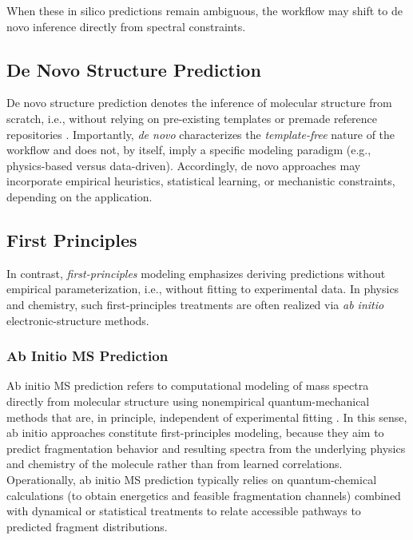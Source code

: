 When these in silico predictions remain ambiguous, the workflow may shift to de novo inference directly from spectral constraints.

\subsection{De Novo Structure Prediction}

De novo structure prediction denotes the inference of molecular structure from scratch, i.e., without relying on pre-existing templates or premade reference repositories
\cite[p.~1]{Yasonik2020}.
Importantly, \emph{de novo} characterizes the \emph{template-free} nature of the workflow and does not, by itself, imply a specific modeling paradigm (e.g., physics-based versus data-driven).
Accordingly, de novo approaches may incorporate empirical heuristics, statistical learning, or mechanistic constraints, depending on the application. \cite[pp.~701--702]{Wei2019}

\subsection{First Principles}
In contrast, \emph{first-principles} modeling emphasizes deriving predictions without empirical parameterization, i.e., without fitting to experimental data. \cite[p.~1]{Bhattacharyya2019}
In physics and chemistry, such first-principles treatments are often realized via \emph{ab initio} electronic-structure methods.

\subsubsection{Ab Initio MS Prediction}

Ab initio MS prediction refers to computational modeling of mass spectra directly from molecular structure using nonempirical quantum-mechanical methods that are, in principle, independent of experimental fitting \cite[p.~1921]{Minkin1999}.
In this sense, ab initio approaches constitute first-principles modeling, because they aim to predict fragmentation behavior and resulting spectra from the underlying physics and chemistry of the molecule rather than from learned correlations.
Operationally, ab initio MS prediction typically relies on quantum-chemical calculations (to obtain energetics and feasible fragmentation channels) combined with dynamical or statistical treatments to relate accessible pathways to predicted fragment distributions.

